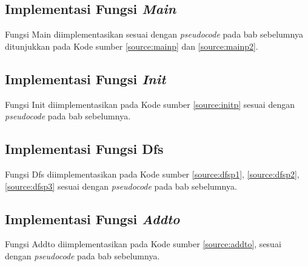 	\subsection{\quad Implementasi Fungsi \textit{Main}}
	\quad Fungsi Main diimplementasikan sesuai dengan \textit{pseudocode} pada bab sebelumnya ditunjukkan pada Kode sumber \ref{source:mainp} dan \ref{source:mainp2}.
	
	
	\vspace{-1cm}
	\subsection{\quad Implementasi Fungsi \textit{Init}}
	\quad Fungsi Init diimplementasikan pada Kode sumber \ref{source:initp} sesuai dengan \textit{pseudocode} pada bab sebelumnya.
	
	\subsection{\quad Implementasi Fungsi Dfs}
	\quad Fungsi Dfs diimplementasikan pada Kode sumber \ref{source:dfsp1}, \ref{source:dfsp2}, \ref{source:dfsp3}  sesuai dengan \textit{pseudocode} pada bab sebelumnya.
	
	\vspace{1cm}
	
	
	\vspace{-0.6cm}
	\subsection{\quad Implementasi Fungsi \textit{Addto}}
	\quad Fungsi Addto diimplementasikan pada Kode sumber \ref{source:addto}, sesuai dengan \textit{pseudocode} pada bab sebelumnya.
	
